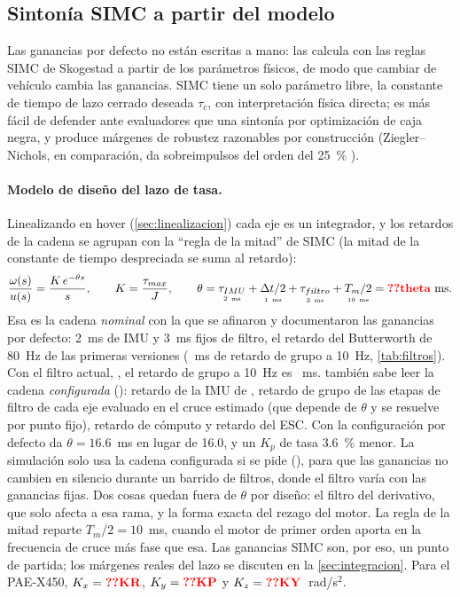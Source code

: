 \subsection{Sintonía SIMC a partir del modelo}

Las ganancias por defecto no están escritas a mano: 
las calcula con las reglas SIMC de Skogestad \cite{skogestad03} a partir de
los parámetros físicos, de modo que cambiar de vehículo cambia las
ganancias. SIMC tiene un solo parámetro libre, la constante de tiempo de
lazo cerrado deseada $\tau_c$, con interpretación física directa; es más
fácil de defender ante evaluadores que una sintonía por optimización de caja
negra, y produce márgenes de robustez razonables por construcción
(Ziegler--Nichols, en comparación, da sobreimpulsos del orden del 25~\%
\cite{astrom04}).

\paragraph{Modelo de diseño del lazo de tasa.} Linealizando en hover
(\cref{sec:linealizacion}) cada eje es un integrador, y los retardos de la
cadena se agrupan con la ``regla de la mitad'' de SIMC (la mitad de la
constante de tiempo despreciada se suma al retardo):
\begin{equation}
\frac{\omega(s)}{u(s)}=\frac{K\,e^{-\theta s}}{s},\qquad
K=\frac{\tau_{max}}{J},\qquad
\theta=\underset{\scriptscriptstyle 2\ \text{ms}}{\tau_{IMU}}+\underset{\scriptscriptstyle 1\ \text{ms}}{\Delta t/2}+\underset{\scriptscriptstyle 3\ \text{ms}}{\tau_{filtro}}+\underset{\scriptscriptstyle 10\ \text{ms}}{T_m/2}=\val{theta}~\text{ms}.
\label{eq:simc_planta}
\end{equation}
Esa es la cadena \emph{nominal} con la que se afinaron y documentaron las
ganancias por defecto: 2~ms de IMU y 3~ms fijos de filtro, el retardo del
Butterworth de 80~Hz de las primeras versiones (~ms de retardo de
grupo a 10~Hz, \cref{tab:filtros}). Con el filtro actual, , el
retardo de grupo a 10~Hz es ~ms.  también sabe
leer la cadena \emph{configurada} (): retardo
de la IMU de , retardo de grupo de las etapas de filtro de
cada eje evaluado en el cruce estimado (que depende de $\theta$ y se
resuelve por punto fijo), retardo de cómputo y retardo del ESC. Con la
configuración por defecto da $\theta=16.6$~ms en lugar de 16.0, y un $K_p$ de
tasa 3.6~\% menor. La simulación solo usa la cadena configurada si se pide
(), para que las ganancias no cambien en
silencio durante un barrido de filtros, donde el filtro varía con las
ganancias fijas. Dos cosas quedan fuera de $\theta$ por diseño: el filtro del
derivativo, que solo afecta a esa rama, y la forma exacta del rezago del
motor. La regla de la mitad reparte $T_m/2=10$~ms, cuando el motor de primer
orden aporta en la frecuencia de cruce más fase que esa. Las ganancias SIMC
son, por eso, un punto de partida; los márgenes reales del lazo se discuten
en la \cref{sec:integracion}. Para el PAE-X450,
$K_x=\val{KR}$, $K_y=\val{KP}$ y $K_z=\val{KY}$~rad/s$^2$.

